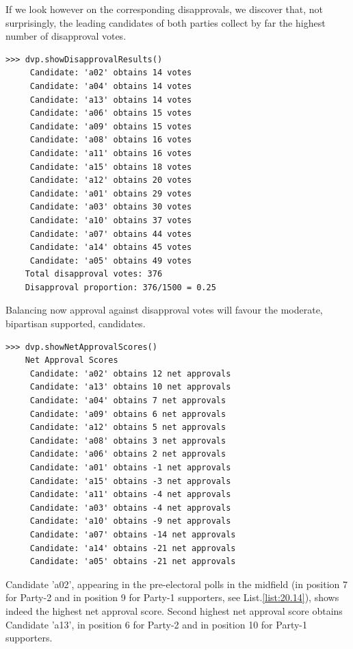 If we look however on the corresponding disapprovals, we discover that, not surprisingly, the leading candidates of both parties collect by far the highest number of disapproval votes. 
\begin{lstlisting}
>>> dvp.showDisapprovalResults()
     Candidate: 'a02' obtains 14 votes
     Candidate: 'a04' obtains 14 votes
     Candidate: 'a13' obtains 14 votes
     Candidate: 'a06' obtains 15 votes
     Candidate: 'a09' obtains 15 votes
     Candidate: 'a08' obtains 16 votes
     Candidate: 'a11' obtains 16 votes
     Candidate: 'a15' obtains 18 votes
     Candidate: 'a12' obtains 20 votes
     Candidate: 'a01' obtains 29 votes
     Candidate: 'a03' obtains 30 votes
     Candidate: 'a10' obtains 37 votes
     Candidate: 'a07' obtains 44 votes
     Candidate: 'a14' obtains 45 votes
     Candidate: 'a05' obtains 49 votes
    Total disapproval votes: 376
    Disapproval proportion: 376/1500 = 0.25
\end{lstlisting}
Balancing now approval against disapproval votes will favour the moderate, bipartisan supported, candidates.
\begin{lstlisting}
>>> dvp.showNetApprovalScores()
    Net Approval Scores
     Candidate: 'a02' obtains 12 net approvals
     Candidate: 'a13' obtains 10 net approvals
     Candidate: 'a04' obtains 7 net approvals
     Candidate: 'a09' obtains 6 net approvals
     Candidate: 'a12' obtains 5 net approvals
     Candidate: 'a08' obtains 3 net approvals
     Candidate: 'a06' obtains 2 net approvals
     Candidate: 'a01' obtains -1 net approvals
     Candidate: 'a15' obtains -3 net approvals
     Candidate: 'a11' obtains -4 net approvals
     Candidate: 'a03' obtains -4 net approvals
     Candidate: 'a10' obtains -9 net approvals
     Candidate: 'a07' obtains -14 net approvals
     Candidate: 'a14' obtains -21 net approvals
     Candidate: 'a05' obtains -21 net approvals
\end{lstlisting}
Candidate 'a02', appearing in the pre-electoral polls in the midfield (in position 7 for Party-2 and in position 9 for Party-1 supporters, see List.\vref{list:20.14}), shows indeed the highest net approval score. Second highest net approval score obtains Candidate 'a13', in  position 6 for Party-2 and in position 10 for Party-1 supporters.

